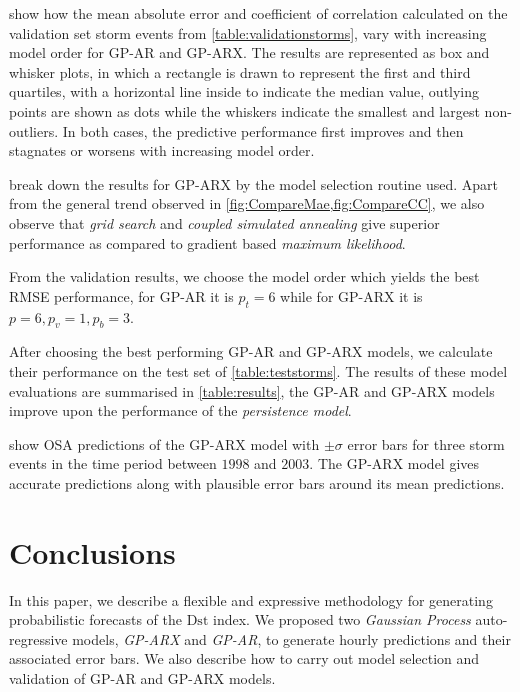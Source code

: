  show how the mean absolute error and coefficient of correlation 
calculated on the validation set storm events from \cref{table:validationstorms}, vary with 
increasing model order for GP-AR and GP-ARX. The results are represented as box and whisker plots, 
in which a rectangle is drawn to represent the first and third quartiles, with a horizontal line 
inside to indicate the median value, outlying points are shown as dots while the whiskers indicate 
the smallest and largest non-outliers. In both cases, the predictive performance first improves and 
then stagnates or worsens with increasing model order. 

 break down the results for GP-ARX by the model selection 
routine used. Apart from the general trend observed in \cref{fig:CompareMae,fig:CompareCC}, we also 
observe that \emph{grid search} and \emph{coupled simulated annealing} give superior performance as 
compared to gradient based \emph{maximum likelihood}.

From the validation results, we choose the model order which yields the best RMSE performance, for 
GP-AR it is $p_t = 6$ while for GP-ARX it is $p = 6, p_v = 1, p_b = 3$.

After choosing the best performing GP-AR and GP-ARX models, we calculate their performance on the 
test set of \cref{table:teststorms}. The results of these model evaluations are summarised in 
\cref{table:results}, the GP-AR and GP-ARX models improve upon the performance of the 
\emph{persistence model}.

 show OSA predictions of the GP-ARX model 
with $\pm \sigma$ error bars for three storm events in the time period between $1998$ and $2003$. 
The GP-ARX model gives accurate predictions along with plausible error bars around its mean 
predictions.

\section{Conclusions}

In this paper, we describe a flexible and expressive methodology for generating probabilistic 
forecasts of the $\mathrm{Dst}$ index. We proposed two \emph{Gaussian Process} auto-regressive 
models, \emph{GP-ARX} and \emph{GP-AR}, to generate hourly predictions and their associated error 
bars. We also describe how to carry out model selection and validation of GP-AR and GP-ARX models.


